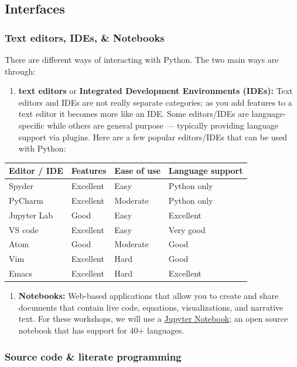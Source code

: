 \documentclass[]{book}
\providecommand{\tightlist}{%
  \setlength{\itemsep}{0pt}\setlength{\parskip}{0pt}}
\begin{document}
\subsection{Interfaces}\label{interfaces-1}

\subsubsection{Text editors, IDEs, \&
Notebooks}\label{text-editors-ides-notebooks-1}

There are different ways of interacting with Python. The two main ways
are through:

\begin{enumerate}
\def\labelenumi{\arabic{enumi}.}
\tightlist
\item
  \textbf{text editors} or \textbf{Integrated Development Environments
  (IDEs):} Text editors and IDEs are not really separate categories; as
  you add features to a text editor it becomes more like an IDE. Some
  editors/IDEs are language-specific while others are general purpose
  --- typically providing language support via plugins. Here are a few
  popular editors/IDEs that can be used with Python:
\end{enumerate}

\begin{longtable}[]{@{}llll@{}}
\toprule
Editor / IDE & Features & Ease of use & Language support\tabularnewline
\midrule
\endhead
Spyder & Excellent & Easy & Python only\tabularnewline
PyCharm & Excellent & Moderate & Python only\tabularnewline
Jupyter Lab & Good & Easy & Excellent\tabularnewline
VS code & Excellent & Easy & Very good\tabularnewline
Atom & Good & Moderate & Good\tabularnewline
Vim & Excellent & Hard & Good\tabularnewline
Emacs & Excellent & Hard & Excellent\tabularnewline
\bottomrule
\end{longtable}

\begin{enumerate}
\def\labelenumi{\arabic{enumi}.}
\setcounter{enumi}{1}
\tightlist
\item
  \textbf{Notebooks:} Web-based applications that allow you to create
  and share documents that contain live code, equations, visualizations,
  and narrative text. For these workshops, we will use a
  \href{https://jupyter.org/}{Jupyter Notebook}; an open source notebook
  that has support for 40+ languages.
\end{enumerate}

\subsubsection{Source code \& literate
programming}\label{source-code-literate-programming-1}
\end{document}
